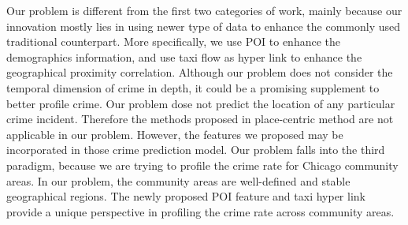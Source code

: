 Our problem is different from the first two categories of work, mainly because our innovation mostly lies in using newer type of data to enhance the commonly used traditional counterpart. More specifically, we use POI to enhance the demographics information, and use taxi flow as hyper link to enhance the geographical proximity correlation. Although our problem does not consider the temporal dimension of crime in depth, it could be a promising supplement to better profile crime. Our problem dose not predict the location of any particular crime incident. Therefore the methods proposed in place-centric method are not applicable in our problem. However, the features we proposed may be incorporated in those crime prediction model. 
Our problem falls into the third paradigm,  because we are trying to profile the crime rate for Chicago community areas. In our problem, the community areas are well-defined and stable geographical regions. The newly proposed POI feature and taxi hyper link provide a unique perspective in profiling the crime rate across community areas.

